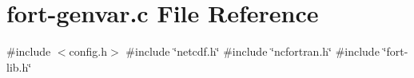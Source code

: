 \hypertarget{fort-genvar_8c}{}\section{fort-\/genvar.c File Reference}
\label{fort-genvar_8c}
{\ttfamily \#include $<$config.\+h$>$}\newline
{\ttfamily \#include \char`\"{}netcdf.\+h\char`\"{}}\newline
{\ttfamily \#include \char`\"{}ncfortran.\+h\char`\"{}}\newline
{\ttfamily \#include \char`\"{}fort-\/lib.\+h\char`\"{}}\newline
